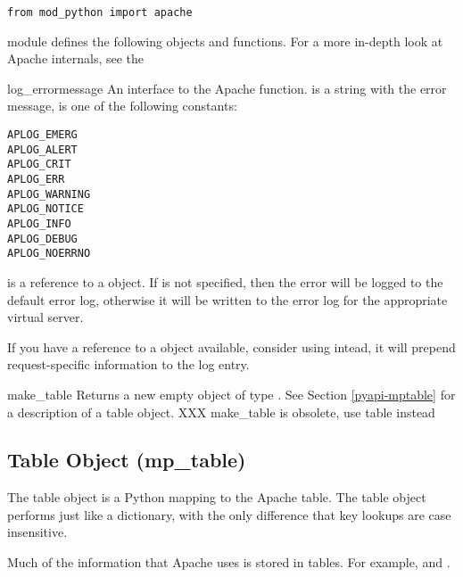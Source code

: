 \begin{verbatim}
from mod_python import apache
\end{verbatim}

 module defines the following objects and
functions. For a more in-depth look at Apache internals, see the

\begin{funcdesc}{log_error}{message}
An interface to the Apache
function.  is a string with the error message,  is
one of the following constants:

\begin{verbatim}
APLOG_EMERG
APLOG_ALERT
APLOG_CRIT
APLOG_ERR
APLOG_WARNING
APLOG_NOTICE
APLOG_INFO
APLOG_DEBUG
APLOG_NOERRNO
\end{verbatim}            
      
 is a reference to a  object. If
 is not specified, then the error will be logged to the default
error log, otherwise it will be written to the error log for the
appropriate virtual server.

If you have a reference to a  object available,
consider using  intead, it will prepend
request-specific information to the log entry.
\end{funcdesc}

\begin{funcdesc}{make_table}{}
Returns a new empty object of type . See Section \ref{pyapi-mptable}
for a description of a table object. XXX make_table is obsolete, use table instead
\end{funcdesc}

\subsection{Table Object (mp_table)\label{pyapi-mptable}}

The table object is a Python mapping to the Apache table. The table
object performs just like a dictionary, with the only difference that
key lookups are case insensitive.

Much of the information that Apache uses is stored in tables. For
example,  and .

